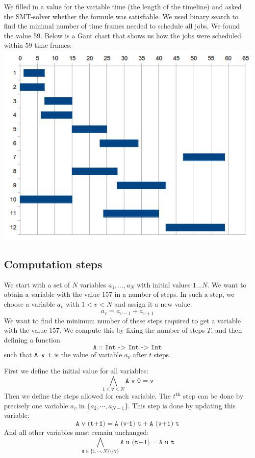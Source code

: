 \documentclass[12pt]{article}
\begin{document}
We filled in a value for the variable time (the length of the timeline) 
and asked the SMT-solver whether the formule was satisfiable. 
We used binary search to find the minimal number of time frames needed to schedule all jobs. 
We found the value 59. 
Below is a Gant chart that shows us how the jobs were scheduled within 59 time frames:
\includegraphics[width=15cm]{gantchart.png}

\subsection*{Computation steps}
We start with a set of $N$ variables $a_1, \dots, a_N$ with initial values $1 \dots N$.
We want to obtain a variable with the value 157 in a number of steps. 
In such a step, we choose a variable $a_v$ with $1 < v < N$ and assign it a new value:
\[ a_v = a_{v-1} + a_{v+1} \]
We want to find the minimum number of these steps required to get a variable with the value 157.
We compute this by fixing the number of steps $T$, and then defining a function
\[\texttt{A :: Int -> Int -> Int}\]
such that \texttt{A v t} is the value of variable $a_v$ after $t$ steps.

First we define the initial value for all variables:
\[ \bigwedge_{1 \le \texttt{v} \le N} \texttt{A v 0} = \texttt{v} \]
Then we define the steps allowed for each variable.
The $t^\mathtt{th}$ step can be done by precisely one variable $a_v$ in $\{ a_2, \cdots, a_{N-1} \}$.
This step is done by updating this variable:
\[\texttt{A v (t+1)} = \texttt{A (v-1) t} + \texttt{A (v+1) t}\]
And all other variables must remain unchanged:
\[\bigwedge_{ \texttt{u} \in \{1, \cdots, N\} \setminus \{ \texttt{v} \} } \texttt{A u (t+1)} = \texttt{A u t}\]
\end{document}
